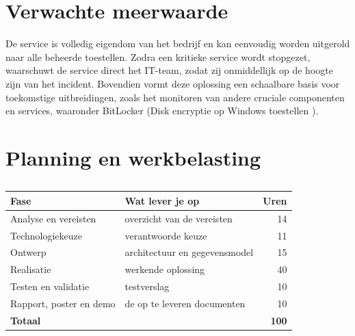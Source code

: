 
\section{Verwachte meerwaarde}%
\label{vst:meerwaarde}


De service is volledig eigendom van het bedrijf en kan eenvoudig worden uitgerold naar alle beheerde toestellen. Zodra een kritieke service wordt stopgezet, waarschuwt de service direct het IT-team, zodat zij onmiddellijk op de hoogte zijn van het incident. Bovendien vormt deze oplossing een schaalbare basis voor toekomstige uitbreidingen, zoals het monitoren van andere cruciale componenten en services, waaronder BitLocker (Disk encryptie op Windows toestellen ).


\section{Planning en werkbelasting}%
\label{vst:planning}


\begin{table}[htbp]
  \centering
  \begin{tabular}{llr}
    \toprule
    \textbf{Fase} & \textbf{Wat lever je op} & \textbf{Uren} \\
    \midrule
    Analyse en vereisten      & overzicht van de vereisten   & 14  \\
    Technologiekeuze          & verantwoorde keuze           & 11  \\
    Ontwerp                   & architectuur en gegevensmodel& 15  \\
    Realisatie                & werkende oplossing           & 40  \\
    Testen en validatie       & testverslag                  & 10  \\
    Rapport, poster en demo   & de op te leveren documenten  & 10  \\
    \midrule
    \textbf{Totaal}           &                              & \textbf{100} \\
    \bottomrule
  \end{tabular}
  \caption[Planning en werkbelasting]{\label{tab:vst-planning}%
    }
\end{table}

